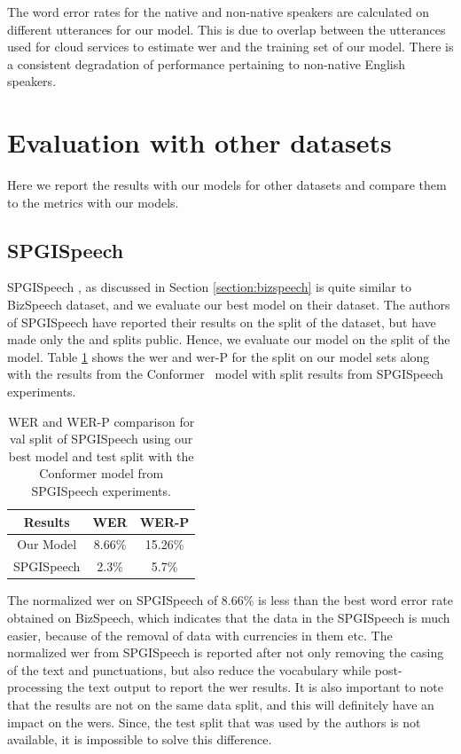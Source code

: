 The word error rates for the native and non-native speakers are calculated on different utterances for our model. This is due to overlap between the utterances used for cloud services to estimate \acrshort{wer} and the training set of our model. There is a consistent degradation of performance pertaining to non-native English speakers.


\section{Evaluation with other datasets}
Here we report the results with our models for other datasets and compare them to the metrics with our models. 
\subsection{SPGISpeech}
SPGISpeech \cite{Oneill2021SPGISpeech:Recognition}, as discussed in Section \ref{section:bizspeech} is quite similar to BizSpeech dataset, and we evaluate our best model on their dataset. The authors of SPGISpeech have reported their results on the  split of the dataset, but have made only the  and  splits public. Hence, we evaluate our model on the  split of the model. Table \ref{table:spgi} shows the \acrshort{wer} and \acrshort{wer}-P for the  split on our model sets along with the results from the Conformer \cite{Gulati2020Conformer:Recognition} \ model with  split results from SPGISpeech experiments.
\begin{table}[ht]
\centering
\begin{tabular}{c | c c  }
\hline
\textbf{Results} & WER & WER-P \\
 \hline
  Our Model & 8.66\% & 15.26\% \\
  SPGISpeech \cite{Oneill2021SPGISpeech:Recognition} & 2.3\% & 5.7\% \\
 \hline
\end{tabular}
\caption{\label{table:spgi} WER and WER-P comparison for val split of SPGISpeech using our best model and test split with the Conformer model from SPGISpeech experiments.}
\end{table}

The normalized \acrshort{wer} on SPGISpeech of 8.66\% is less than the best word error rate obtained on BizSpeech, which indicates that the data in the SPGISpeech is much easier, because of the removal of data with currencies in them etc. The normalized \acrshort{wer} from SPGISpeech is reported after not only removing the casing of the text and punctuations, but also reduce the vocabulary while post-processing the text output to report the \acrshort{wer} results.  It is also important to note that the results are not on the same data split, and this will definitely have an impact on the \acrshort{wer}s. Since, the test split that was used by the authors is not available, it is impossible  to solve this difference.

